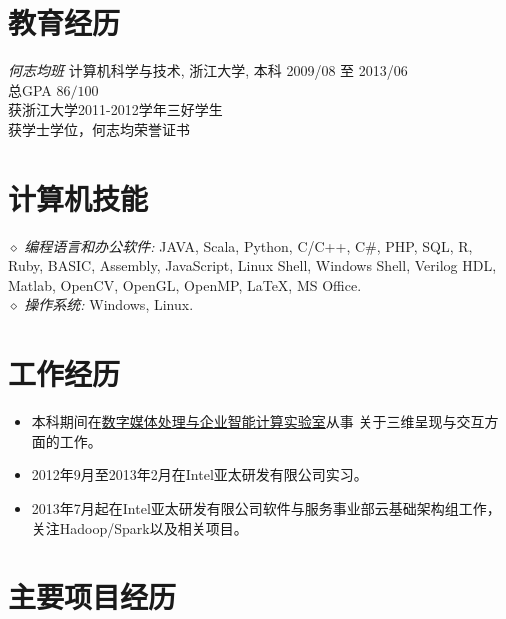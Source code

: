 \documentclass[line,margin]{res}
\begin{document}
\address{联系电话:\sl +86-152-1686-1267}
\address{E-mail:\sl me at daoyuan.wang}


\begin{resume}

\section{教育经历} {\sl 何志均班} 计算机科学与技术, 浙江大学, 本科 \hfill 2009/08 至 2013/06\\
                总GPA $86/100$\\
                获浙江大学2011-2012学年三好学生\\
                获学士学位，何志均荣誉证书\\

\section{计算机技能} {$\diamond$ \sl 编程语言和办公软件:} JAVA, Scala, Python, C/C++, C\#, PHP, SQL, R, Ruby, BASIC, Assembly, JavaScript, Linux Shell, Windows Shell, Verilog HDL, Matlab, OpenCV, OpenGL, OpenMP, \LaTeX, MS Office. \\
                {$\diamond$ \sl 操作系统:} Windows, Linux.

\section{工作经历}
            \begin{itemize}
            \item 本科期间在\href{http://give.zju.edu.cn}{数字媒体处理与企业智能计算实验室}从事
                关于三维呈现与交互方面的工作。
            \item 2012年9月至2013年2月在Intel亚太研发有限公司实习。
            \item 2013年7月起在Intel亚太研发有限公司软件与服务事业部云基础架构组工作，关注Hadoop/Spark以及相关项目。
            \end{itemize}

\section{主要项目经历} 


\end{resume}
\end{document}
